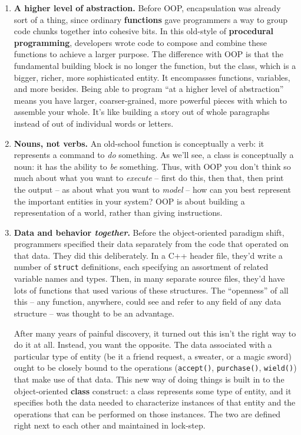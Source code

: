\begin{enumerate}
\itemsep.1em

\item \textbf{A higher level of abstraction.} Before OOP, encapsulation was
already sort of a thing, since ordinary \textbf{functions} gave programmers a
way to group code chunks together into cohesive bits. In this old-style of
\textbf{procedural programming}, developers wrote code to compose and combine
these functions to achieve a larger purpose. The difference with OOP is that
the fundamental building block is no longer the function, but the class, which
is a bigger, richer, more sophisticated entity. It encompasses functions,
variables, and more besides. Being able to program ``at a higher level of
abstraction'' means you have larger, coarser-grained, more powerful pieces
with which to assemble your whole. It's like building a story out of whole
paragraphs instead of out of individual words or letters.

\item \textbf{Nouns, not verbs.} An old-school function is conceptually a
verb: it represents a command to \textit{do} something. As we'll see, a class
is conceptually a noun: it has the ability to \textit{be} something. Thus,
with OOP you don't think so much about what you want to \textit{execute} --
first do this, then that, then print the output -- as about what you want to
\textit{model} -- how can you best represent the important entities in your
system? OOP is about building a representation of a world, rather than giving
instructions.

\item \textbf{Data and behavior \textit{together}.} Before the object-oriented
paradigm shift, programmers specified their data separately from the code that
operated on that data. They did this deliberately. In a C++ header file,
they'd write a number of \texttt{struct} definitions, each specifying an
assortment of related variable names and types. Then, in many separate source
files, they'd have lots of functions that used various of these structures.
The ``openness'' of all this -- any function, anywhere, could see and refer to
any field of any data structure -- was thought to be an advantage.

After many years of painful discovery, it turned out this isn't the right way
to do it at all. Instead, you want the opposite. The data associated with a
particular type of entity (be it a friend request, a sweater, or a magic
sword) ought to be closely bound to the operations (\texttt{accept()},
\texttt{purchase()}, \texttt{wield()}) that make use of that data. This new
way of doing things is built in to the object-oriented \textbf{class}
construct: a class represents some type of entity, and it specifies both the
data needed to characterize instances of that entity and the operations that
can be performed on those instances. The two are defined right next to each
other and maintained in lock-step.


\end{enumerate}
